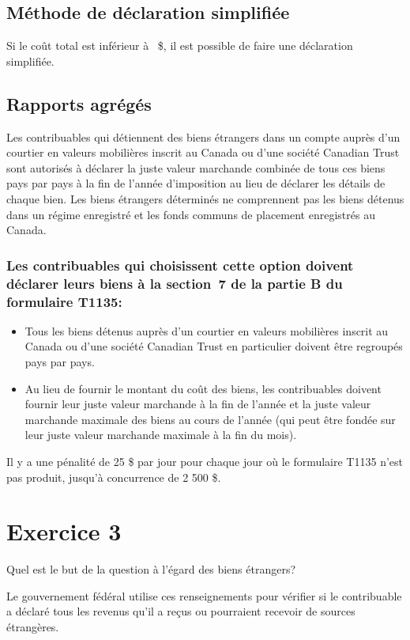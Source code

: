 \subsection{Méthode de déclaration simplifiée}
Si le coût total est inférieur à ~\$, il est possible de faire une déclaration simplifiée.


\subsection{Rapports agrégés}
Les contribuables qui détiennent des biens étrangers dans un compte auprès d'un courtier en valeurs mobilières inscrit au Canada ou d'une société Canadian Trust sont autorisés à déclarer la juste valeur marchande combinée de tous ces biens pays par pays à la fin de l'année d'imposition au lieu de déclarer les détails de chaque bien. Les biens étrangers déterminés ne comprennent pas les biens détenus dans un régime enregistré et les fonds communs de placement enregistrés au Canada.

\subsubsection{Les contribuables qui choisissent cette option doivent déclarer leurs biens à la section~7 de la partie B du formulaire T1135:}
\begin{itemize}
	\item Tous les biens détenus auprès d'un courtier en valeurs mobilières inscrit au Canada ou d'une société Canadian Trust en particulier doivent être regroupés pays par pays.
	\item Au lieu de fournir le montant du coût des biens, les contribuables doivent fournir leur juste valeur marchande à la fin de l'année et la juste valeur marchande maximale des biens au cours de l'année (qui peut être fondée sur leur juste valeur marchande maximale à la fin du mois).
\end{itemize}

Il y a une pénalité de 25 \$ par jour pour chaque jour où le formulaire T1135 n'est pas produit, jusqu'à concurrence de 2 500 \$.



\section{Exercice 3}
\setcounter{question}{0}
\begin{question}
	Quel est le but de la question à l'égard des biens étrangers?
\end{question}
Le gouvernement fédéral utilise ces renseignements pour vérifier si le contribuable a déclaré tous les revenus qu'il a reçus ou pourraient recevoir de sources étrangères.

